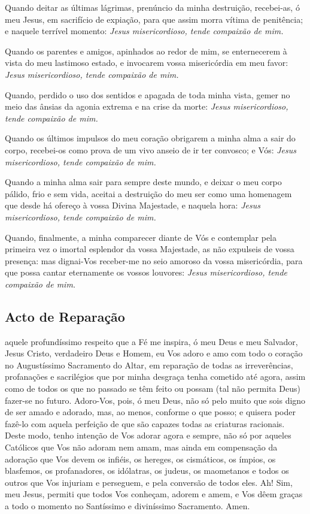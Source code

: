 Quando deitar as últimas lágrimas, prenúncio da minha destruição, recebei-as, ó meu Jesus, em sacrifício de expiação, para que assim morra vítima de penitência; e naquele terrível momento: \textit{Jesus misericordioso, tende compaixão de mim.}\par
Quando os parentes e amigos, apinhados ao redor de mim, se enternecerem à vista do meu lastimoso estado, e invocarem vossa misericórdia em meu favor: \textit{Jesus misericordioso, tende compaixão de mim.}\par
Quando, perdido o uso dos sentidos e apagada de toda minha vista, gemer no meio das ânsias da agonia extrema e na crise da morte: \textit{Jesus misericordioso, tende compaixão de mim.}\par
Quando os últimos impulsos do meu coração obrigarem a minha alma a sair do corpo, recebei-os como prova de um vivo anseio de ir ter convosco; e Vós: \textit{Jesus misericordioso, tende compaixão de mim.}\par
Quando a minha alma sair para sempre deste mundo, e deixar o meu corpo pálido, frio e sem vida, aceitai a destruição do meu ser como uma homenagem que desde há ofereço à vossa Divina Majestade, e naquela hora: \textit{Jesus misericordioso, tende compaixão de mim.}\par
Quando, finalmente, a minha comparecer diante de Vós e contemplar pela primeira vez o imortal esplendor da vossa Majestade, as não expulseis de vossa presença: mas dignai-Vos receber-me no seio amoroso da vossa misericórdia, para que possa cantar eternamente os vossos louvores: \textit{Jesus misericordioso, tende compaixão de mim.}\par

\subsection{Acto de Reparação}
 aquele profundíssimo respeito que a Fé me inspira, ó meu Deus e meu Salvador, Jesus Cristo, verdadeiro Deus e Homem, eu Vos adoro e amo com todo o coração no Augustíssimo Sacramento do Altar, em reparação de todas as irreverências, profanações e sacrilégios que por minha desgraça tenha cometido até agora, assim como de todos os que no passado se têm feito ou possam (tal não permita Deus) fazer-se no futuro. Adoro-Vos, pois, ó meu Deus, não só pelo muito que sois digno de ser amado e adorado, mas, ao menos, conforme o que posso; e quisera poder fazê-lo com aquela perfeição de que são capazes todas as criaturas racionais. Deste modo, tenho intenção de Vos adorar agora e sempre, não só por aqueles Católicos que Vos não adoram nem amam, mas ainda em compensação da adoração que Vos devem os infiéis, os hereges, os cismáticos, os ímpios, os blasfemos, os profanadores, os idólatras, os judeus, os maometanos e todos os outros que Vos injuriam e perseguem, e pela conversão de todos eles. Ah! Sim, meu Jesus, permiti que todos Vos conheçam, adorem e amem, e Vos dêem graças a todo o momento no Santíssimo e diviníssimo Sacramento. Amen.

